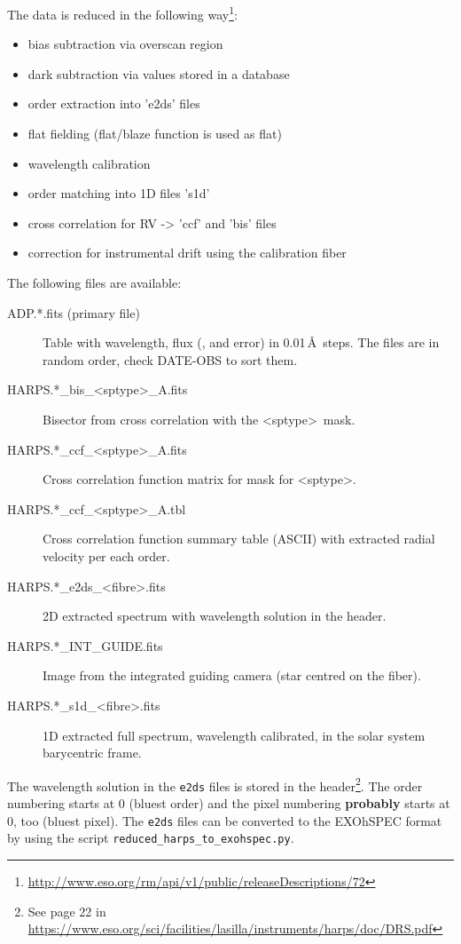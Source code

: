 \documentclass[10pt,a4paper]{article}
\begin{document}
The data is reduced in the following way\footnote{\url{http://www.eso.org/rm/api/v1/public/releaseDescriptions/72}}:
\begin{itemize}\setlength\itemsep{0em}
  \item bias subtraction via overscan region
  \item dark subtraction via values stored in a database
  \item order extraction into 'e2ds' files
  \item flat fielding (flat/blaze function is used as flat)
  \item wavelength calibration
  \item order matching into 1D files 's1d'
  \item cross correlation for RV -> 'ccf' and 'bis' files
  \item correction for instrumental drift using the calibration fiber
\end{itemize}

The following files are available:
\begin{description}
  \item[ADP.*.fits (primary file)] Table with wavelength, flux (, and error) in 0.01\,\AA\ steps. The files are in random order, check DATE-OBS to sort them.
  \item[HARPS.*\_bis\_\textless sptype\textgreater\_A.fits] Bisector from cross correlation with the \textless sptype\textgreater\ mask.
  \item[HARPS.*\_ccf\_\textless sptype\textgreater\_A.fits] Cross correlation function matrix for mask for \textless sptype\textgreater.
  \item[HARPS.*\_ccf\_\textless sptype\textgreater\_A.tbl]  Cross correlation function summary table (ASCII) with extracted radial velocity per each order.
  \item[HARPS.*\_e2ds\_\textless fibre\textgreater.fits] 2D extracted spectrum with wavelength solution in the header.
  \item[HARPS.*\_INT\_GUIDE.fits] Image from the integrated guiding camera (star centred on the fiber).
  \item[HARPS.*\_s1d\_\textless fibre\textgreater.fits] 1D extracted full spectrum, wavelength calibrated, in the solar system barycentric frame.
\end{description}

The wavelength solution in the \verb|e2ds| files is stored in the header\footnote{See page 22 in \url{https://www.eso.org/sci/facilities/lasilla/instruments/harps/doc/DRS.pdf}}. The order numbering starts at 0 (bluest order) and the pixel numbering \textbf{probably} starts at 0, too (bluest pixel). The \verb|e2ds| files can be converted to the EXOhSPEC format by using the script \verb|reduced_harps_to_exohspec.py|.
\end{document}
